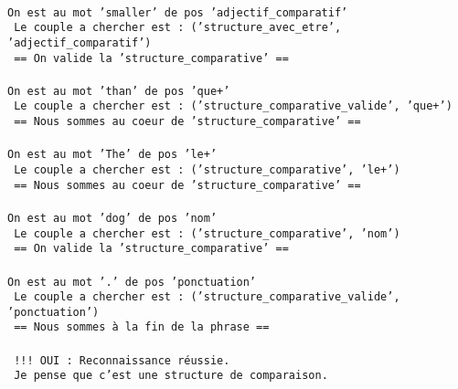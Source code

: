 {\begin{minipage}{.85\textwidth}
{ \\
\texttt{On est au mot 'smaller' de pos 'adjectif\_comparatif' } \\
\texttt{\hspace{1cm} 	Le couple a chercher est : ('structure\_avec\_etre', 'adjectif\_comparatif')} \\
\texttt{\hspace{1cm} 	== On valide la 'structure\_comparative' ==} \\
 \\
\texttt{On est au mot 'than' de pos 'que+' } \\
\texttt{\hspace{1cm} 	Le couple a chercher est : ('structure\_comparative\_valide', 'que+')} \\
\texttt{\hspace{1cm} 	== Nous sommes au coeur de 'structure\_comparative' ==} \\
 \\
\texttt{On est au mot 'The' de pos 'le+' } \\
\texttt{\hspace{1cm} 	Le couple a chercher est : ('structure\_comparative', 'le+')} \\
\texttt{\hspace{1cm} 	== Nous sommes au coeur de 'structure\_comparative' ==} \\
 \\
\texttt{On est au mot 'dog' de pos 'nom' } \\
\texttt{\hspace{1cm} 	Le couple a chercher est : ('structure\_comparative', 'nom')} \\
\texttt{\hspace{1cm} 	== On valide la 'structure\_comparative' ==} \\
 \\
\texttt{On est au mot '.' de pos 'ponctuation' } \\
\texttt{\hspace{1cm} 	Le couple a chercher est : ('structure\_comparative\_valide', 'ponctuation')} \\
\texttt{\hspace{1cm} 	== Nous sommes à la fin de la phrase ==} \\
 \\
\texttt{ !!! OUI : Reconnaissance réussie.} \\
\texttt{ Je pense que c'est une structure de comparaison.} \\

}
 \end{minipage}
 }



